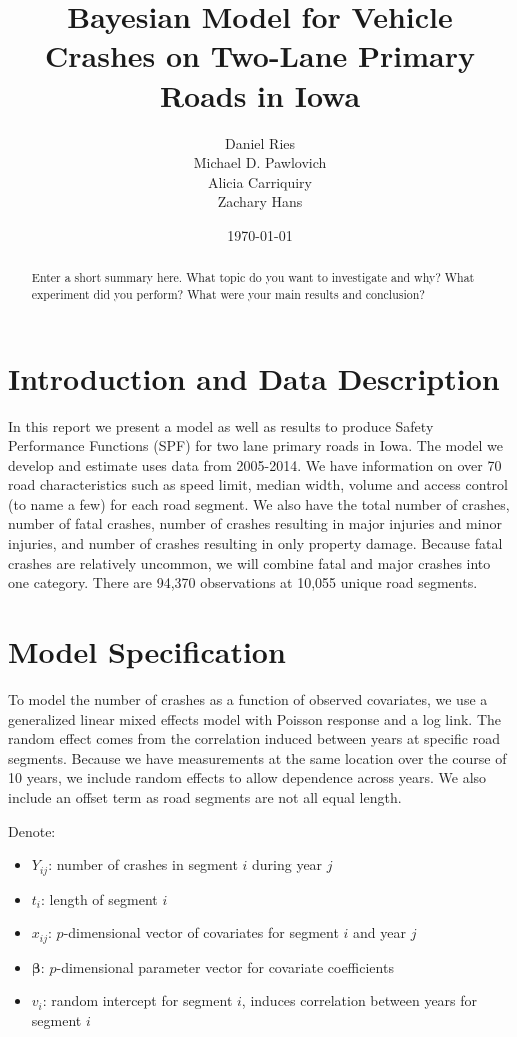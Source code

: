 \documentclass[a4paper]{article}\usepackage[]{graphicx}\usepackage[]{color}
\title{Bayesian Model for Vehicle Crashes on Two-Lane Primary Roads in Iowa}
\author{Daniel Ries \\ Michael D. Pawlovich \\ Alicia Carriquiry \\ Zachary Hans}
\date{\today}
\begin{document}
\maketitle

\begin{abstract}
Enter a short summary here. What topic do you want to investigate and why? What experiment did you perform? What were your main results and conclusion?
\end{abstract}

\tableofcontents

\section{Introduction and Data Description}

In this report we present a model as well as results to produce Safety Performance Functions (SPF) for two lane primary roads in Iowa. The model we develop and estimate uses data from 2005-2014. We have information on over 70 road characteristics such as speed limit, median width, volume and access control (to name a few) for each road segment. We also have the total number of crashes, number of fatal crashes, number of crashes resulting in major injuries and minor injuries, and number of crashes resulting in only property damage. Because fatal crashes are relatively uncommon, we will combine fatal and major crashes into one category. There are 94,370 observations at 10,055 unique road segments. 


\section{Model Specification}

To model the number of crashes as a function of observed covariates, we use a generalized linear mixed effects model with Poisson response and a log link. The random effect comes from the correlation induced between years at specific road segments. Because we have measurements at the same location over the course of 10 years, we include random effects to allow dependence across years. We also include an offset term as road segments are not all equal length. 

Denote:

\begin{itemize}
\item
$Y_{ij}$: number of crashes in segment $i$ during year $j$
\item
$t_i$: length of segment $i$
\item
$x_{ij}$: $p$-dimensional vector of covariates for segment $i$ and year $j$
\item
$\boldsymbol{\beta}$: $p$-dimensional parameter vector for covariate coefficients
\item
$v_i$: random intercept for segment $i$, induces correlation between years for segment $i$
\end{itemize}
\end{document}
